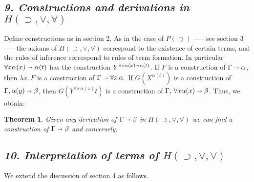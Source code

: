 \documentclass[12pt]{article}
\def\imp{\shortrightarrow}
\def\l{\lambda}
\def\limp{\supset}
\def\PI{P(\limp)}
\def\G{\Gamma}
\def\a{\alpha}
\def\b{\beta}
\def\gimpb{\G \imp \b}
\def\gimpa{\G \imp \a}
\def\HIMP{H(\limp, \lor, \forall)}
\newtheorem{theorem}{Theorem}
\begin{document}
\subsection*{\it 9. Constructions and derivations in $\HIMP$}

Define constructions as in section 2. As in the case of $\PI$ —-- see section 3 —-- the axioms of $\HIMP$ correspond to the existence of
certain terms, and the rules of inference correspond to rules of term formation. In particular $\forall x \a(x) \imp \a(t)$ has the
construction $Y^{\forall x  \a(x) \imp \a(t)}$. If $F$ is a construction of $\gimpa$, then $\l x. \, F$ is a construction of $\G \imp \forall x \, \a$. If $G(X^{\a(t)})$ is a construction of $\G,\a(y) \imp \b$, then $G(Y^{\forall x \, \a (x)} t)$ is a construction of 
$\G, \, \forall x \a (x) \imp \b$. Thus, we obtain:

\begin{theorem}
Given any derivation of $\gimpb$ in $\HIMP$ we can find a construction of $\gimpb$ and conversely.
\end{theorem}

\subsection*{\it 10. Interpretation of terms of $\HIMP$}

We extend the discussion of section 4 as follows.
\end{document}
